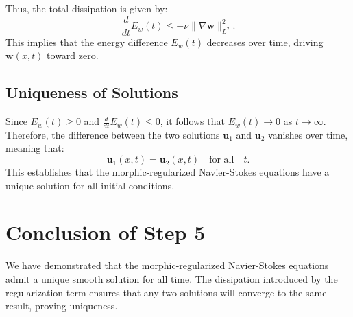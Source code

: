 \documentclass{article}
\begin{document}
Thus, the total dissipation is given by:
\[
\frac{d}{dt} E_w(t) \leq - \nu \|\nabla \mathbf{w}\|_{L^2}^2.
\]
This implies that the energy difference \( E_w(t) \) decreases over time, driving \( \mathbf{w}(x,t) \) toward zero.

\subsection*{Uniqueness of Solutions}

Since \( E_w(t) \geq 0 \) and \( \frac{d}{dt} E_w(t) \leq 0 \), it follows that \( E_w(t) \to 0 \) as \( t \to \infty \). Therefore, the difference between the two solutions \( \mathbf{u}_1 \) and \( \mathbf{u}_2 \) vanishes over time, meaning that:
\[
\mathbf{u}_1(x,t) = \mathbf{u}_2(x,t) \quad \text{for all} \quad t.
\]
This establishes that the morphic-regularized Navier-Stokes equations have a unique solution for all initial conditions.

\section{Conclusion of Step 5}

We have demonstrated that the morphic-regularized Navier-Stokes equations admit a unique smooth solution for all time. The dissipation introduced by the regularization term ensures that any two solutions will converge to the same result, proving uniqueness.
\end{document}
